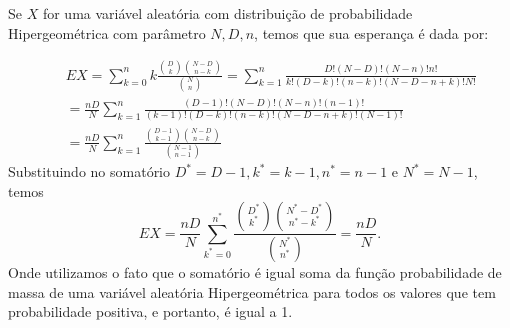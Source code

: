 %
\begin{frame}
\begin{exem}[Hipergeométrica]
Se $X$ for uma variável aleatória
com distribuição de probabilidade Hipergeométrica com parâmetro
$N,D,n$, temos que sua esperança é dada por:

\begin{eqnarray}
& &
EX=\sum_{k=0}^{n}k\frac{\binom{D}{k}\binom{N-D}{n-k}}{\binom{N}{n}}=\sum_{k=1}^{n}\frac{D!(N-D)!(N-n)!n!}{k!(D-k)!(n-k)!(N-D-n+k)!N!}\nonumber\\
& & =
\frac{nD}{N}\sum_{k=1}^{n}\frac{(D-1)!(N-D)!(N-n)!(n-1)!}{(k-1)!(D-k)!(n-k)!(N-D-n+k)!(N-1)!}\nonumber \\ & & =\frac{nD}{N}\sum_{k=1}^{n}\frac{\binom{D-1}{k-1}\binom{N-D}{n-k}}{\binom{N-1}{n-1}}\nonumber
\end{eqnarray}
%
%
%
%
Substituindo no somatório $D^*=D-1,k^*=k-1,n^*=n-1$ e $N^*=N-1$,
temos
$$EX=\frac{nD}{N}\sum_{k^*=0}^{n^*}\frac{\binom{D^*}{k^*}\binom{N^*-D^*}{n^*-k^*}}{\binom{N^*}{n^*}}=\frac{nD}{N}.$$
Onde utilizamos o fato que o somatório é igual soma da função
probabilidade de massa de uma variável aleatória Hipergeométrica
para todos os valores que tem probabilidade positiva, e portanto, é
igual a 1.
%
%
\end{exem}
\end{frame}
%
